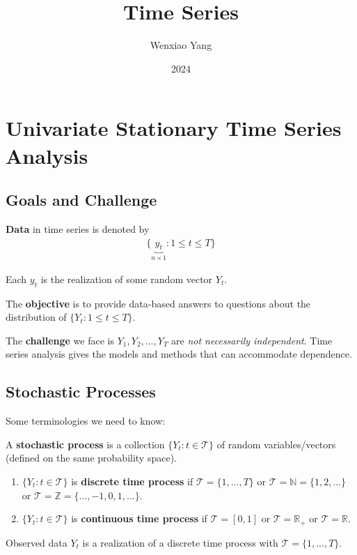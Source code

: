 \documentclass[11pt]{elegantbook}
\title{Time Series}
\author{Wenxiao Yang}
\institute{Haas School of Business, University of California Berkeley}
\date{2024}
\begin{document}
\maketitle

\frontmatter
\tableofcontents

\mainmatter

\chapter{Univariate Stationary Time Series Analysis}
\section{Goals and Challenge}
\textbf{Data} in time series is denoted by
\begin{equation}
    \begin{aligned}
        \{\underbrace{y_t}_{n\times 1}:1\leq t\leq T\}
    \end{aligned}
    \nonumber
\end{equation}
\begin{assumption}
    Each $y_t$ is the realization of some random vector $Y_t$.
\end{assumption}
The \textbf{objective} is to provide data-based answers to questions about the distribution of $\{Y_t:1\leq t\leq T\}$.

The \textbf{challenge} we face is $Y_1,Y_2,...,Y_T$ are \textit{not necessarily independent}. Time series analysis gives the models and methods that can accommodate dependence.

\section{Stochastic Processes}
Some terminologies we need to know:
\begin{definition}
    A \textbf{stochastic process} is a collection $\{Y_t:t\in\mathcal{T}\}$ of random variables/vectors (defined on the same probability space).
    \begin{enumerate}
        \item $\{Y_t:t\in\mathcal{T}\}$ is \textbf{discrete time process} if $\mathcal{T}=\{1,...,T\}$ or $\mathcal{T}=\mathbb{N}=\{1,2,...\}$ or $\mathcal{T}=\mathbb{Z}=\{...,-1,0,1,...\}$.
        \item $\{Y_t:t\in\mathcal{T}\}$ is \textbf{continuous time process} if $\mathcal{T}=[0,1]$ or $\mathcal{T}=\mathbb{R}_+$ or $\mathcal{T}=\mathbb{R}$.
    \end{enumerate}
\end{definition}
Observed data $Y_t$ is a realization of a discrete time process with $\mathcal{T}=\{1,...,T\}$.
\end{document}

